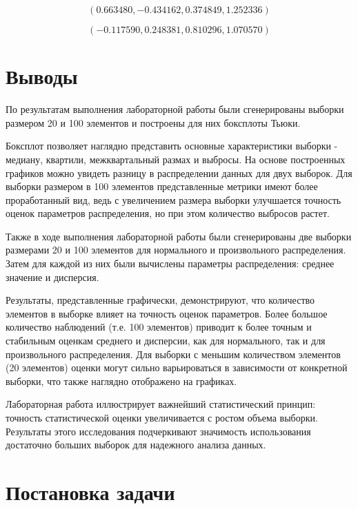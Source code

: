 \documentclass[12pt,a4paper]{article}
\begin{document}
	\vspace{12em}

	\[
		(0.663480, -0.434162, 0.374849, 1.252336)
	\]

	\[
		(-0.117590, 0.248381, 0.810296, 1.070570)
	\]

	\vspace{10em}

	\section{Выводы}

	По результатам выполнения лабораторной работы были сгенерированы выборки
	размером 20 и 100 элементов и построены для них боксплоты Тьюки.

	Боксплот позволяет наглядно представить основные характеристики выборки
	- медиану, квартили, межквартальный размах и выбросы. На основе
	построенных графиков можно увидеть разницу в распределении данных для
	двух выборок. Для выборки размером в 100 элементов представленные
	метрики имеют более проработанный вид, ведь с увеличением размера
	выборки улучшается точность оценок параметров распределения, но при этом
	количество выбросов растет.

	Также в ходе выполнения лабораторной работы были сгенерированы две
	выборки размерами 20 и 100 элементов для нормального и произвольного
	распределения. Затем для каждой из них были вычислены параметры
	распределения: среднее значение и дисперсия.

	Результаты, представленные графически, демонстрируют, что количество
	элементов в выборке влияет на точность оценок параметров. Более большое
	количество наблюдений (т.е. 100 элементов) приводит к более точным и
	стабильным оценкам среднего и дисперсии, как для нормального, так и для
	произвольного распределения. Для выборки с меньшим количеством элементов
	(20 элементов) оценки могут сильно варьироваться в зависимости от
	конкретной выборки, что также наглядно отображено на графиках.

	Лабораторная работа иллюстрирует важнейший статистический принцип:
	точность статистической оценки увеличивается с ростом объема выборки.
	Результаты этого исследования подчеркивают значимость использования
	достаточно больших выборок для надежного анализа данных.

	\section{Постановка задачи}
\end{document}
